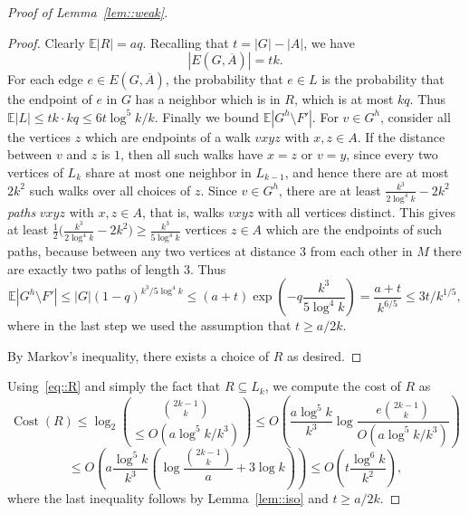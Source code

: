 \documentclass[12pt]{article}
\renewcommand{\bar}[1]{\overline{#1}}
\DeclareMathOperator{\cost}{Cost}
\begin{document}
\begin{proof}[Proof of Lemma~\ref{lem::weak}]
\begin{proof}
Clearly $\mathbb{E}|R| = aq$. Recalling that $t = |G| - |A|$, we have
\begin{equation}\label{eq::egabar}
|E(G,\bar{A})| = tk .
\end{equation}
For each edge $e \in E(G,\bar{A})$, the probability that $e \in L$ is the probability that the endpoint of $e$ in $G$ has a neighbor which is in $R$, which is at most $kq$. Thus $\mathbb{E}|L| \leq tk \cdot kq \leq 6 t \log^5 k/k$. Finally we bound $\mathbb{E}|G^h \setminus F'|$. For $v \in G^h$, consider all the vertices $z$ which are endpoints of a walk $vxyz$ with $x,z \in A$. If the distance between $v$ and $z$ is $1$, then all such walks have $x=z$ or $v=y$, since every two vertices of $L_k$ share at most one neighbor in $L_{k-1}$, and hence there are at most $2k^2$ such walks over all choices of $z$. Since $v \in G^h$, there are at least $\frac{k^3}{2\log^4 k} - 2k^2$ \emph{paths} $vxyz$ with $x,z \in A$, that is, walks $vxyz$ with all vertices distinct. This gives at least $\frac{1}{2} \big(\frac{k^3}{2\log^4 k} - 2k^2 \big) \geq \frac{k^3}{5 \log^4 k}$ vertices $z \in A$ which are the endpoints of such paths, because between any two vertices at distance $3$ from each other in $M$ there are exactly two paths of length $3$. Thus
\[ \mathbb{E}|G^h \setminus F'| \leq |G| (1-q)^{k^3/5\log^4 k} \leq (a+t) \exp\left( - q \frac{k^3}{5\log^4 k} \right) = \frac{a+t}{k^{6/5}} \leq 3t/k^{1/5} ,\]
where in the last step we used the assumption that $t \geq a/2k$.

By Markov's inequality, there exists a choice of $R$ as desired.
\end{proof}

Using~\eqref{eq::R} and simply the fact that $R \subseteq L_k$, we compute the cost of $R$ as
\[ \cost(R) \leq \log_2 \binom{\binom{2k-1}{k}}{\leq O(a\log^5 k / k^3)} \leq O\left( \frac{a \log^5 k}{k^3} \log\frac{e\binom{2k-1}{k}}{O(a\log^5 k/k^3)} \right) \]
\begin{equation}\label{eq::costR}
\leq O\left( a \frac{\log^5 k}{k^3} \left( \log\frac{\binom{2k-1}{k}}{a} + 3\log k\right) \right) \leq O\left( t \frac{\log^6 k}{k^2} \right) ,
\end{equation}
where the last inequality follows by Lemma~\ref{lem::iso} and $t \geq a/2k$.


\end{proof}
\end{document}
